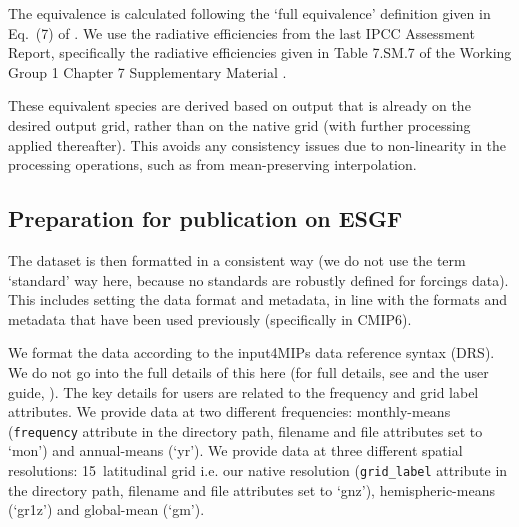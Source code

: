 The equivalence is calculated following the `full equivalence' definition given in Eq.~(7) of \citet{meinshausen_historical-ghgs_2017}.
We use the radiative efficiencies from the last IPCC Assessment Report,
specifically the radiative efficiencies given in Table 7.SM.7 of the Working Group 1 Chapter 7 Supplementary Material \citep{IPCC_AR6-WG1-Ch-7-SM_2021}.

These equivalent species are derived based on output that is already on the desired output grid,
rather than on the native grid (with further processing applied thereafter).
This avoids any consistency issues due to non-linearity in the processing operations,
such as from mean-preserving interpolation.

\subsection{Preparation for publication on ESGF}
\label{ssec:prep-for-esgf}

The dataset is then formatted in a consistent way
(we do not use the term `standard' way here,
because no standards are robustly defined for forcings data).
This includes setting the data format and metadata,
in line with the formats and metadata that have been used previously (specifically in CMIP6).

We format the data according to the input4MIPs data reference syntax (DRS).
We do not go into the full details of this here
(for full details, see \citet{input4mips-cvs_docs_2026} and the user guide, \citealp{nicholls_historical-user-guide_2026}).
The key details for users are related to the frequency and grid label attributes.
We provide data at two different frequencies:
monthly-means (\texttt{frequency} attribute in the directory path, filename and file attributes set to `mon')
and annual-means (`yr').
We provide data at three different spatial resolutions:
15\textdegree~latitudinal grid i.e. our native resolution (\texttt{grid\_label} attribute in the directory path, filename and file attributes set to `gnz'),
hemispheric-means (`gr1z')
and global-mean (`gm').

